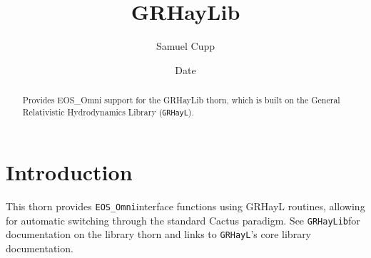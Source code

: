 \documentclass{article}
\begin{document}
\title{GRHayLib}
\author{Samuel Cupp}
\date{$ $Date$ $}

\maketitle


\newcommand{\grhayl}{\texttt{GRHayL}}
\newcommand{\glib}{\texttt{GRHayLib}}
\newcommand{\omni}{\texttt{EOS_Omni}}
\newcommand{\gomni}{\texttt{GRHayL_Omni}}

\begin{abstract}
Provides EOS_Omni support for the GRHayLib thorn, which
is built on the General Relativistic Hydrodynamics
Library (\grhayl).
\end{abstract}

\section{Introduction}

This thorn provides \omni interface functions using GRHayL
routines, allowing for automatic switching through the
standard Cactus paradigm. See \glib for documentation on
the library thorn and links to \grhayl's core library
documentation.

\end{document}
